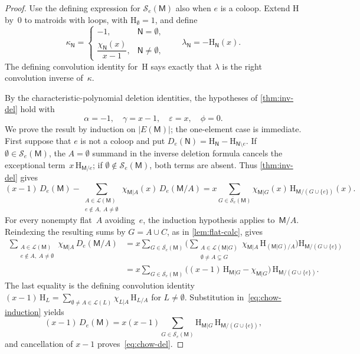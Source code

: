 \documentclass[12pt,letterpaper,english]{amsart}
\theoremstyle{teoremas}
\theoremstyle{definition}
\newcommand{\M}{\mathsf{M}}
\newcommand{\N}{\mathsf{N}}
\renewcommand{\H}{\mathrm{H}}
\newcommand{\Se}{\mathcal{S}_e}
\begin{document}
\begin{proof}
Use the defining expression for $\Se(\M)$ also when $e$ is a coloop.
Extend $\H$ by~$0$ to matroids with loops, with $\H_{\emptyset} = 1$,
and define
\[
\kappa_{\N} =
\begin{cases}
-1, & \N = \emptyset, \\
\dfrac{\chi_{\N}(x)}{x - 1}, & \N \neq \emptyset,
\end{cases}
\qquad \lambda_{\N} = -\H_{\N}(x).
\]
The defining convolution identity for~$\H$ says exactly that $\lambda$ is
the right convolution inverse of~$\kappa$.

By the characteristic-polynomial deletion identities, the hypotheses
of \cref{thm:inv-del} hold with
\[
\alpha = -1,\quad \gamma = x-1,\quad \varepsilon = x,\quad \phi = 0.
\]
We prove the result by induction on $|E(\M)|$; the one-element case is
immediate.  First suppose that $e$ is not a coloop and put
$D_e(\N) = \H_{\N} - \H_{\N \setminus e}$.
If $\emptyset \in \Se(\M)$, the $A = \emptyset$ summand in the inverse
deletion formula cancels the exceptional term~$x\, \H_{\M/e}$;
if $\emptyset \notin \Se(\M)$, both terms are absent.
Thus \cref{thm:inv-del} gives
\begin{equation}\label{eq:chow-induction}
(x-1)\, D_e(\M)
- \sum_{\substack{A \in \mathcal{L}(\M) \\
    e \notin A,\; A \neq \emptyset}}
  \chi_{\M|A}(x)\, D_e(\M/A)
= x \sum_{G \in \overline{\Se}(\M)}
  \chi_{\M|G}(x)\, \H_{\M/(G \cup \{e\})}(x).
\end{equation}
For every nonempty flat~$A$ avoiding~$e$, the induction hypothesis
applies to~$\M/A$.  Reindexing the resulting sums by $G = A \cup C$,
as in \cref{lem:flat-calc}, gives
\begin{align*}
\sum_{\substack{A \in \mathcal{L}(\M) \\
    e \notin A,\; A \neq \emptyset}}
  \chi_{\M|A}\, D_e(\M/A)
&= x \sum_{G \in \overline{\Se}(\M)}
  \Biggl(\sum_{\substack{A \in \mathcal{L}(\M|G) \\
    \emptyset \neq A \subsetneq G}}
  \chi_{\M|A}\, \H_{(\M|G)/A}\Biggr)
  \H_{\M/(G \cup \{e\})} \\
&= x \sum_{G \in \overline{\Se}(\M)}
  \bigl((x-1)\, \H_{\M|G} - \chi_{\M|G}\bigr)\,
  \H_{\M/(G \cup \{e\})}.
\end{align*}
The last equality is the defining convolution identity
$(x - 1)\, \H_L = \sum_{\emptyset \neq A \in \mathcal{L}(L)}
\chi_{L|A}\, \H_{L/A}$ for $L \neq \emptyset$.
Substitution in~\eqref{eq:chow-induction} yields
\[
(x-1)\, D_e(\M) = x(x-1) \sum_{G \in \overline{\Se}(\M)}
  \H_{\M|G}\, \H_{\M/(G \cup \{e\})},
\]
and cancellation of $x - 1$ proves~\eqref{eq:chow-del}.


\end{proof}
\end{document}
